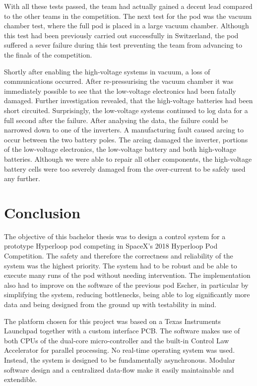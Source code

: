 With all these tests passed, the team had actually gained a decent lead compared to the other teams in the competition. The next test for the pod was the vacuum chamber test, where the full pod is placed in a large vacuum chamber. Although this test had been previously carried out successfully in Switzerland, the pod suffered a sever failure during this test preventing the team from advancing to the finals of the competition.

Shortly after enabling the high-voltage systems in vacuum, a loss of communications occurred. After re-pressurising the vacuum chamber it was immediately possible to see that the low-voltage electronics had been fatally damaged. Further investigation revealed, that the high-voltage batteries had been short circuited. Surprisingly, the low-voltage systems continued to log data for a full second after the failure. After analysing the data, the failure could be narrowed down to one of the inverters. A manufacturing fault caused arcing to occur between the two battery poles. The arcing damaged the inverter, portions of the low-voltage electronics, the low-voltage battery and both high-voltage batteries. Although we were able to repair all other components, the high-voltage battery cells were too severely damaged from the over-current to be safely used any further.

\section{Conclusion}


The objective of this bachelor thesis was to design a control system for a prototype Hyperloop pod competing in SpaceX's 2018 Hyperloop Pod Competition. The safety and therefore the correctness and reliability of the system was the highest priority. The system had to be robust and be able to execute many runs of the pod without needing intervention. The implementation also had to improve on the software of the previous pod Escher, in particular by simplifying the system, reducing bottlenecks, being able to log significantly more data and being designed from the ground up with testability in mind.


The platform chosen for this project was based on a Texas Instruments Launchpad together with a custom interface PCB. The software makes use of both CPUs of the dual-core micro-controller and the built-in Control Law Accelerator for parallel processing. No real-time operating system was used. Instead, the system is designed to be fundamentally asynchronous. Modular software design and a centralized data-flow make it easily maintainable and extendible.

